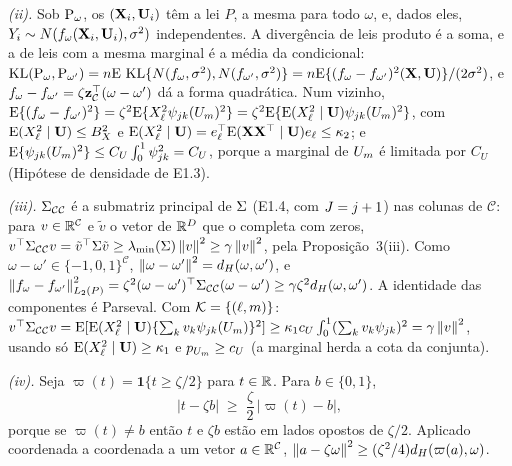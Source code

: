 \documentclass[11pt,a4paper]{article}
\newcommand{\lmin}{\lambda_{\min}}
\newcommand{\Kcal}{\mathcal{K}}
\newcommand{\Ccal}{\mathcal{C}}
\newcommand{\dH}{d_{H}}
\newcommand{\bz}{\mathbf{z}}
\newcommand{\KL}{\operatorname{KL}}
\begin{document}
\emph{(ii).} Sob $\mathrm{P}_{\omega}$, os $(\mathbf{X}_{i},\mathbf{U}_{i})$ têm a lei $P$, a
mesma para todo $\omega$, e, dados eles, $Y_{i} \sim
N(f_{\omega}(\mathbf{X}_{i},\mathbf{U}_{i}),\sigma^{2})$ independentes. A divergência de
leis produto é a soma, e a de leis com a mesma marginal é a média da
condicional: $\KL(\Prob_{\omega},\Prob_{\omega'}) = n\E\,\KL\{N(f_{\omega},
\sigma^{2}),N(f_{\omega'},\sigma^{2})\} = n\E\{(f_{\omega} -
f_{\omega'})^{2}(\bX,\bU)\}/(2\sigma^{2})$, e $f_{\omega} - f_{\omega'} =
\zeta\bz_{\Ccal}\T(\omega - \omega')$ dá a forma quadrática. Num vizinho,
$\mathrm{E}\{(f_{\omega} - f_{\omega'})^{2}\} = \zeta^{2}\mathrm{E}\{X_{\ell}^{2}
\psi_{jk}(U_{m})^{2}\} = \zeta^{2}\mathrm{E}\{\mathrm{E}(X_{\ell}^{2}\mid\mathbf{U})
\psi_{jk}(U_{m})^{2}\}$, com $\mathrm{E}(X_{\ell}^{2}\mid\mathbf{U}) \le B_{X}^{2}$ e
$\mathrm{E}(X_{\ell}^{2}\mid\mathbf{U}) = e_{\ell}^{\top}\mathrm{E}(\mathbf{X}\mathbf{X}^{\top}\mid\mathbf{U})e_{\ell} \le \kappa_{2}$;
e $\mathrm{E}\{\psi_{jk}(U_{m})^{2}\} \le C_{U}\int_{0}^{1}\psi_{jk}^{2} =
C_{U}$, porque a marginal de $U_{m}$ é limitada por $C_{U}$ (Hipótese de
densidade de E1.3).

\emph{(iii).} $\Gram_{\Ccal\Ccal}$ é a submatriz principal de $\Sigma$ (E1.4,
com $J = j + 1$) nas colunas de $\Ccal$: para $v \in \R^{\Ccal}$ e
$\tilde v$ o vetor de $\mathbb{R}^{D}$ que o completa com zeros, $v\T\Gram_{\Ccal\Ccal}v
= \tilde v\T\Gram\tilde v \ge \lmin(\Gram)\norm{v}^{2} \ge \gamma\norm{v}^{2}$,
pela Proposição~3(iii). Como $\omega - \omega' \in \{-1,0,1\}^{\Ccal}$,
$\norm{\omega - \omega'}^{2} = \dH(\omega,\omega')$, e
$\normL{f_{\omega} - f_{\omega'}}^{2} = \zeta^{2}(\omega -
\omega')\T\Gram_{\Ccal\Ccal}(\omega - \omega') \ge
\gamma\zeta^{2}\dH(\omega,\omega')$. A identidade das componentes é Parseval.
Com $\Kcal = \{(\cv,\md)\}$: $v\T\Gram_{\Ccal\Ccal}v =
\E[\E(X_{\cv}^{2}\mid\bU)\{\sum_{\tsl}v_{\tsl}\wav{\lev}{\tsl}(U_{\md})\}^{2}]
\ge \kappa_{1}c_{U}\int_{0}^{1}(\sum_{\tsl}v_{\tsl}\wav{\lev}{\tsl})^{2} =
\gamma\norm{v}^{2}$, usando só $\mathrm{E}(X_{\ell}^{2}\mid\mathbf{U}) \ge \kappa_{1}$ e
$p_{U_{m}} \ge c_{U}$ (a marginal herda a cota da conjunta).

\emph{(iv).} Seja $\varpi(t) = \mathbf{1}\{t \ge \zeta/2\}$ para $t \in \mathbb{R}$.
Para $b \in \{0,1\}$,
\begin{equation}
  \label{eq:limiar}
  |t - \zeta b| \;\ge\; \frac{\zeta}{2}\,|\varpi(t) - b| ,
\end{equation}
porque se $\varpi(t) \ne b$ então $t$ e $\zeta b$ estão em lados opostos de
$\zeta/2$. Aplicado coordenada a coordenada a um vetor $a \in \R^{\Ccal}$,
$\norm{a - \zeta\omega}^{2} \ge (\zeta^{2}/4)\dH(\varpi(a),\omega)$.
\end{document}

